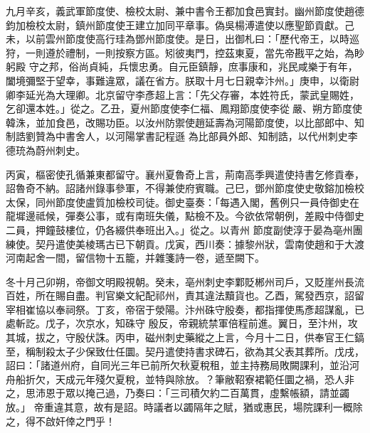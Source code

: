 \begin{pinyinscope}
 九月辛亥，義武軍節度使、檢校太尉、兼中書令王都加食邑實封。幽州節度使趙德鈞加檢校太尉，鎮州節度使王建立加同平章事。偽吳楊溥遣使以應聖節貢獻。己未，以前雲州節度使高行珪為鄧州節度使。是日，出御札曰：「歷代帝王，以時巡狩，一則遵於禮制，一則按察方區。矧彼夷門，控茲東夏，當先帝戡平之始，為眇躬殿
 守之邦，俗尚貞純，兵懷忠勇。自元臣鎮靜，庶事康和，兆民咸樂于有年，闔境彌堅于望幸，事難違眾，議在省方。朕取十月七日親幸汴州。」庚申，以衛尉卿李延光為大理卿。北京留守李彥超上言：「先父存審，本姓符氏，蒙武皇賜姓，乞卻還本姓。」從之。乙丑，夏州節度使李仁福、鳳翔節度使李從嚴、朔方節度使韓洙，並加食邑，改賜功臣。以汝州防禦使趙延壽為河陽節度使，以比部郎中、知制誥劉贊為中書舍人，以河陽掌書記程遜
 為比部員外郎、知制誥，以代州刺史李德珫為蔚州刺史。



 丙寅，樞密使孔循兼東都留守。襄州夏魯奇上言，荊南高季興遣使持書乞修貢奉，詔魯奇不納。詔諸州錄事參軍，不得兼使府賓職。己巳，鄧州節度使史敬鎔加檢校太保，同州節度使盧質加檢校司徒。御史臺奏：「每遇入閣，舊例只一員侍御史在龍墀邊祗候，彈奏公事，或有南班失儀，點檢不及。今欲依常朝例，差殿中侍御史二員，押鐘鼓樓位，仍各綴供奉班出入。」從之。以青州
 節度副使淳于晏為亳州團練使。契丹遣使美棱瑪古已下朝貢。戊寅，西川奏：據黎州狀，雲南使趙和于大渡河南起舍一間，留信物十五籠，并雜箋詩一卷，遞至闕下。



 冬十月己卯朔，帝御文明殿視朝。癸未，亳州刺史李鄴貶郴州司戶，又貶崖州長流百姓，所在賜自盡。判官樂文紀配祁州，責其違法黷貨也。乙酉，駕發西京，詔留宰相崔協以奉祠祭。丁亥，帝宿于滎陽。汴州硃守殷奏，都指揮使馬彥超謀亂，已處斬訖。戊子，次京水，知硃守
 殷反，帝親統禁軍倍程前進。翼日，至汴州，攻其城，拔之，守殷伏誅。丙申，磁州刺史藥縱之上言，今月十二日，供奉官王仁鎬至，稱制殺太子少保致仕任圜。契丹遣使持書求碑石，欲為其父表其葬所。戊戌，詔曰：「諸道州府，自同光三年已前所欠秋夏稅租，並主持務局敗闕課利，並沿河舟船折欠，天成元年殘欠夏稅，並特與除放。？筆敝鞀寮裙範任圜之禍，恐人非之，思沛恩于眾以掩己過，乃奏曰：「三司積欠約二百萬貫，虛繫帳額，請並蠲放。」
 帝重違其意，故有是詔。時議者以蠲隔年之賦，猶或惠民，場院課利一概除之，得不啟奸倖之門乎！




\end{pinyinscope}
